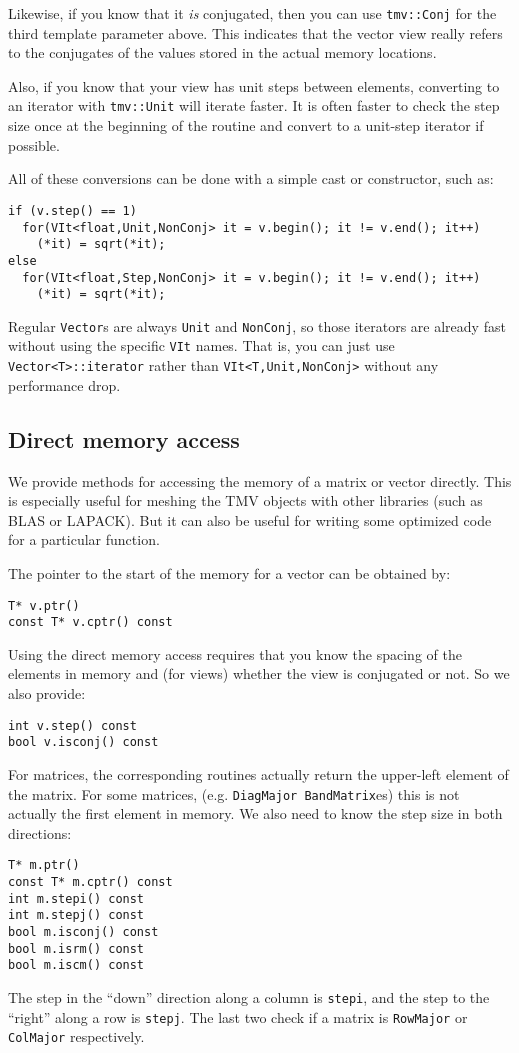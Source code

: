 \documentclass[twoside,letterpaper,11pt]{article}
\renewcommand{\tt}[1]{{\texttt {#1}}}
\begin{document}
Likewise, if you
know that it {\em is} conjugated, then you can use \tt{tmv::Conj} for the 
third template parameter above.  This indicates that the vector view really
refers to the conjugates of the values stored in the actual memory locations.

Also, if you know that your view has unit steps between elements, converting to 
an iterator with \tt{tmv::Unit} will iterate faster.  It is often faster to check
the step size once at the beginning of the routine and convert to a unit-step
iterator if possible.

All of these conversions can be done with a simple cast or constructor, such as:
\begin{verbatim}
if (v.step() == 1)
  for(VIt<float,Unit,NonConj> it = v.begin(); it != v.end(); it++)
    (*it) = sqrt(*it);
else
  for(VIt<float,Step,NonConj> it = v.begin(); it != v.end(); it++)
    (*it) = sqrt(*it);
\end{verbatim}

Regular \tt{Vector}s are always \tt{Unit} and \tt{NonConj}, so those iterators
are already fast without using the specific \tt{VIt} names. 
That is, you can just use \tt{Vector<T>::iterator} rather than \tt{VIt<T,Unit,NonConj>}
without any performance drop.

\subsection{Direct memory access}

We provide methods for accessing the memory of a matrix or vector directly.
This is especially useful for meshing the TMV objects with other libraries
(such as BLAS or LAPACK).  But it can also be useful for writing some
optimized code for a particular function.  

The pointer to the start of the memory for a vector can be obtained by:
\begin{verbatim}
T* v.ptr()
const T* v.cptr() const
\end{verbatim}

Using the direct memory access
requires that you know the spacing of the elements in memory and
(for views) whether the view is conjugated or not.  So we also provide:
\begin{verbatim}
int v.step() const
bool v.isconj() const
\end{verbatim}

For matrices, the corresponding routines actually return the upper-left element
of the matrix.  For some matrices, (e.g. \tt{DiagMajor BandMatrix}es) 
this is not actually the first element in memory.  We also need to know the 
step size in both directions:
\begin{verbatim}
T* m.ptr()
const T* m.cptr() const
int m.stepi() const
int m.stepj() const
bool m.isconj() const
bool m.isrm() const
bool m.iscm() const
\end{verbatim}
The step in the ``down'' direction along a column is \tt{stepi}, and the step to 
the ``right'' along a row is \tt{stepj}.
The last two check if a matrix is \tt{RowMajor} or \tt{ColMajor} respectively.
\end{document}
